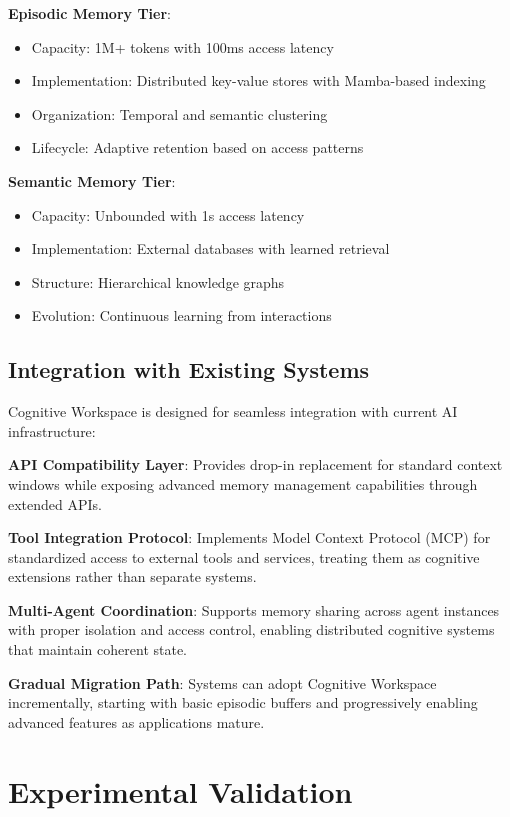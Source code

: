 \documentclass[10pt,twocolumn]{article}
\begin{document}
\textbf{Episodic Memory Tier}:
\begin{itemize}
\item Capacity: 1M+ tokens with 100ms access latency
\item Implementation: Distributed key-value stores with Mamba-based indexing
\item Organization: Temporal and semantic clustering
\item Lifecycle: Adaptive retention based on access patterns
\end{itemize}

\textbf{Semantic Memory Tier}:
\begin{itemize}
\item Capacity: Unbounded with 1s access latency
\item Implementation: External databases with learned retrieval
\item Structure: Hierarchical knowledge graphs
\item Evolution: Continuous learning from interactions
\end{itemize}

\subsection{Integration with Existing Systems}

Cognitive Workspace is designed for seamless integration with current AI infrastructure:

\textbf{API Compatibility Layer}: Provides drop-in replacement for standard context windows while exposing advanced memory management capabilities through extended APIs.

\textbf{Tool Integration Protocol}: Implements Model Context Protocol (MCP) for standardized access to external tools and services, treating them as cognitive extensions rather than separate systems.

\textbf{Multi-Agent Coordination}: Supports memory sharing across agent instances with proper isolation and access control, enabling distributed cognitive systems that maintain coherent state.

\textbf{Gradual Migration Path}: Systems can adopt Cognitive Workspace incrementally, starting with basic episodic buffers and progressively enabling advanced features as applications mature.

\section{Experimental Validation}
\end{document}
